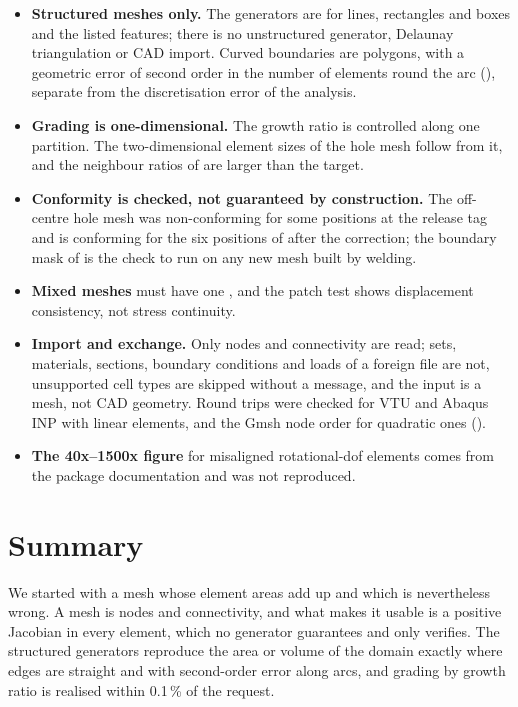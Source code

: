 \begin{limitsbox}
\begin{itemize}
\item \textbf{Structured meshes only.} The generators are for lines, rectangles and boxes and the listed features; there is no unstructured generator, Delaunay triangulation or CAD import. Curved boundaries are polygons, with a geometric error of second order in the number of elements round the arc (), separate from the discretisation error of the analysis.
\item \textbf{Grading is one-dimensional.} The growth ratio is controlled along one partition. The two-dimensional element sizes of the hole mesh follow from it, and the neighbour ratios of  are larger than the target.
\item \textbf{Conformity is checked, not guaranteed by construction.} The off-centre hole mesh was non-conforming for some positions at the release tag and is conforming for the six positions of  after the correction; the boundary mask of  is the check to run on any new mesh built by welding.
\item \textbf{Mixed meshes} must have one , and the patch test shows displacement consistency, not stress continuity.
\item \textbf{Import and exchange.} Only nodes and connectivity are read; sets, materials, sections, boundary conditions and loads of a foreign file are not, unsupported cell types are skipped without a message, and the input is a mesh, not CAD geometry. Round trips were checked for VTU and Abaqus INP with linear elements, and the Gmsh node order for quadratic ones ().
\item \textbf{The 40x--1500x figure} for misaligned rotational-dof elements comes from the package documentation and was not reproduced.
\end{itemize}
\end{limitsbox}

\section{Summary}\label{sec:me-summary}

We started with a mesh whose element areas add up and which is nevertheless wrong. A mesh is nodes and connectivity, and what makes it usable is a positive Jacobian in every element, which no generator guarantees and only  verifies. The structured generators reproduce the area or volume of the domain exactly where edges are straight and with second-order error along arcs, and grading by growth ratio is realised within 0.1\,\% of the request.

